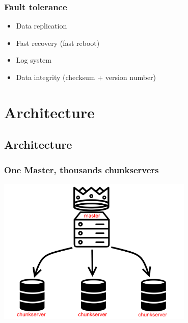 \documentclass{beamer}
\newcommand{\slideheight}{7cm}
\begin{document}
\begin{frame}
 \frametitle{Fault tolerance}
 \begin{itemize}
  \item \alert{Data replication}
  \item \alert{Fast recovery} (fast reboot)
  \item \alert{Log system}
  \item \alert{Data integrity} (checksum + version number)
 \end{itemize}
\end{frame}

\section{Architecture}
\subsection{Architecture}
\begin{frame}
 \frametitle{One Master, thousands chunkservers}
 \centering
 \includegraphics[height=\slideheight]{figures/masterschema.png}
\end{frame}
\end{document}
